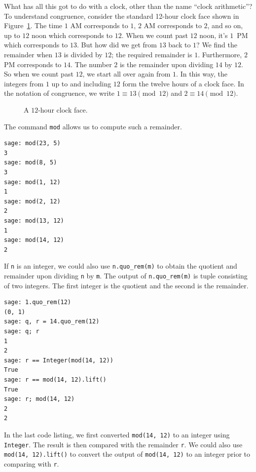 What has all this got to do with a clock, other than the name
``clock arithmetic''? To understand congruence, consider the standard
12-hour clock face shown in
Figure~\ref{fig:number_theory:12_hour_clock_face}. The time $1$ AM
corresponds to $1$, $2$ AM corresponds to $2$, and so on, up to $12$
noon which corresponds to $12$. When we count past $12$ noon, it's
$1$~PM which corresponds to $13$. But how did we get from $13$ back to
$1$? We find the remainder when $13$ is divided by $12$; the required
remainder is $1$. Furthermore, $2$ PM corresponds to $14$. The number
$2$ is the remainder upon dividing $14$ by $12$. So when we count past
$12$, we start all over again from $1$. In this way, the integers from
$1$ up to and including $12$ form the twelve hours of a clock face. In
the notation of congruence, we write $1 \equiv 13 \pmod{12}$ and
$2 \equiv 14 \pmod{12}$.

\begin{figure}[!htbp]
\centering
{}
\caption{A $12$-hour clock face.}
\label{fig:number_theory:12_hour_clock_face}
\end{figure}

The command \verb!mod! allows us to compute such a remainder.

\begin{lstlisting}
sage: mod(23, 5)
3
sage: mod(8, 5)
3
sage: mod(1, 12)
1
sage: mod(2, 12)
2
sage: mod(13, 12)
1
sage: mod(14, 12)
2
\end{lstlisting}

If \verb!n! is an integer, we could also use \verb!n.quo_rem(m)! to
obtain the quotient and remainder upon dividing \verb!n! by
\verb!m!. The output of \verb!n.quo_rem(m)! is tuple consisting of two
integers. The first integer is the quotient and the second is the
remainder.
%
\begin{lstlisting}
sage: 1.quo_rem(12)
(0, 1)
sage: q, r = 14.quo_rem(12)
sage: q; r
1
2
sage: r == Integer(mod(14, 12))
True
sage: r == mod(14, 12).lift()
True
sage: r; mod(14, 12)
2
2
\end{lstlisting}
%
In the last code listing, we first converted \verb!mod(14, 12)! to an
integer using \verb!Integer!. The result is then compared with the
remainder \verb!r!. We could also use \verb!mod(14, 12).lift()! to
convert the output of \verb!mod(14, 12)! to an integer prior to
comparing with \verb!r!.
